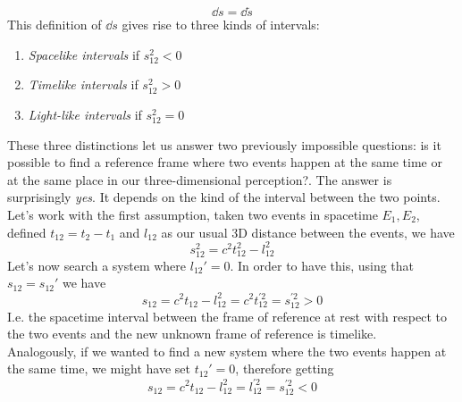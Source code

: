 \documentclass[../admech.tex]{subfiles}
\begin{document}
\begin{equation}
	\dd s=\dd\tilde{s}
	\label{eq:infsinv}
\end{equation}
This definition of $\dd s$ gives rise to three kinds of intervals:
\begin{enumerate}
\item \emph{Spacelike intervals} if $s_{12}^2<0$
\item \emph{Timelike intervals} if $s_{12}^2>0$
\item \emph{Light-like intervals} if $s_{12}^2=0$
\end{enumerate}
These three distinctions let us answer two previously impossible questions: is it possible to find a reference frame where two events happen at the same time or at the same place in our three-dimensional perception?. The answer is surprisingly \textit{yes}. It depends on the kind of the interval between the two points.\\
Let's work with the first assumption, taken two events in spacetime $E_1,E_2$, defined $t_{12}=t_2-t_1$ and $l_{12}$ as our usual 3D distance between the events, we have
\begin{equation*}
	s_{12}^2=c^2t_{12}^2-l^2_{12}
\end{equation*}
Let's now search a system where $l_{12}'=0$. In order to have this, using that $s_{12}=s_{12}'$ we have
\begin{equation*}
	s_{12}=c^2t_{12}-l^2_{12}=c^2t^{'2}_{12}=s_{12}^{'2}>0
\end{equation*}
I.e. the spacetime interval between the frame of reference at rest with respect to the two events and the new unknown frame of reference is timelike.\\
Analogously, if we wanted to find a new system where the two events happen at the same time, we might have set $t_{12}'=0$, therefore getting
\begin{equation}
	s_{12}=c^2t_{12}-l^2_{12}=l^{'2}_{12}=s_{12}^{'2}<0
	\label{eq:spacelike}
\end{equation}
\end{document}
